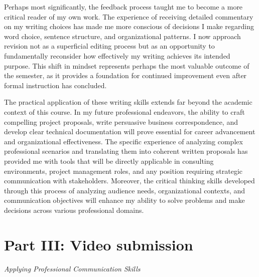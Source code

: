 \documentclass[
]{report}
\begin{document}
Perhaps most significantly, the feedback process taught me to become a
more critical reader of my own work. The experience of receiving
detailed commentary on my writing choices has made me more conscious of
decisions I make regarding word choice, sentence structure, and
organizational patterns. I now approach revision not as a superficial
editing process but as an opportunity to fundamentally reconsider how
effectively my writing achieves its intended purpose. This shift in
mindset represents perhaps the most valuable outcome of the semester, as
it provides a foundation for continued improvement even after formal
instruction has concluded.

The practical application of these writing skills extends far beyond the
academic context of this course. In my future professional endeavors,
the ability to craft compelling project proposals, write persuasive
business correspondence, and develop clear technical documentation will
prove essential for career advancement and organizational effectiveness.
The specific experience of analyzing complex professional scenarios and
translating them into coherent written proposals has provided me with
tools that will be directly applicable in consulting environments,
project management roles, and any position requiring strategic
communication with stakeholders. Moreover, the critical thinking skills
developed through this process of analyzing audience needs,
organizational contexts, and communication objectives will enhance my
ability to solve problems and make decisions across various professional
domains.

\chapter{Part III: Video submission}\label{part-iii-video-submission}

\emph{Applying Professional Communication Skills}
\end{document}
